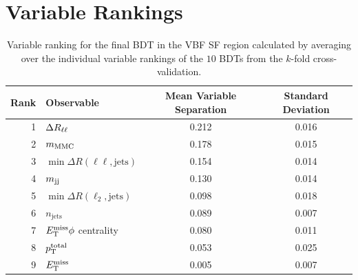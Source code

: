 \section{Variable Rankings}

\begin{table}[htpb]
    \centering
    \caption{Variable ranking for the final BDT in the VBF SF region calculated by averaging over the individual
             variable rankings of the $10$ BDTs from the $k$-fold cross-validation.}\label{tab:mva:variables:ranking:VBFSF}
    \begin{tabular}{rlcc}
        \toprule
        Rank & Observable & Mean Variable Separation & Standard Deviation \\ \midrule
        1 & $\Delta R_{\ell\ell}$ & 0.212 & 0.016 \\
        2 & $m_\text{MMC}$ & 0.178 & 0.015 \\
        3 & $\min \Delta R (\ell\ell, \text{jets})$ & 0.154 & 0.014 \\
        4 & $m_{\text{jj}}$ & 0.130 & 0.014 \\
        5 & $\min \Delta R (\ell_2, \text{jets})$ & 0.098 & 0.018 \\
        6 & $n_\text{jets}$ & 0.089 & 0.007 \\
        7 & $E_\text{T}^\text{miss} \phi$ centrality & 0.080 & 0.011 \\
        8 & $p_\text{T}^\text{total}$ & 0.053 & 0.025 \\
        9 & $E_\text{T}^\text{miss}$ & 0.005 & 0.007 \\
        \bottomrule
    \end{tabular}
\end{table}

